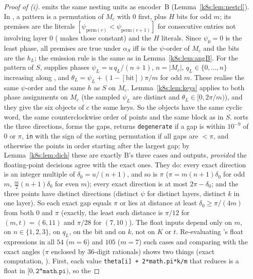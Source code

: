 \begin{proof}[Proof of (i)]
 emits the same nesting units as encoder~B (Lemma~\ref{k8s:lem:nestcl}). In , a pattern is a
permutation  of $M_c$ with $0$ first, plus $H$ bits for odd $m$; its premises are the literals
$[\psi_{\mathrm{perm}(r)}<\psi_{\mathrm{perm}(r+1)}]$ for consecutive entries not involving layer $0$ ( makes
those constant) and the $H$ literals. Since $\psi_0=0$ is the least phase, all premises are true under $\alpha_S$ iff
 is the $\psi$-order of $M_c$ and the bits are the $h_L$; the emission rule is the same as in
Lemma~\ref{k8s:lem:angB}. For the pattern of $S$,  supplies phases $\psi_L=u\,q_L/(n+1)$, $n=|M_c|$,
$q_L\in\{0,\dots,n\}$ increasing along , and $\theta_L=\psi_L+(1-[\text{bit}])\pi/m$ for odd $m$. These realise the
same $\psi$-order and the same $h$ as $S$ on $M_c$. Lemma~\ref{k8s:lem:keys} applies to both phase assignments on $M_c$
(the sampled $\psi_L$ are distinct and $\theta_L\in[0,2\pi/m)$), and they give the six objects of $c$ the same keys. So the
objects have the same cyclic word, the same counterclockwise order of points and the same block as in $S$.  sorts the three directions, forms
the gaps, returns \texttt{degenerate} if a gap is within $10^{-9}$ of $0$ or $\pi$, \texttt{in} with the sign of the
sorting permutation if all gaps are $<\pi$, and otherwise the points in order starting after the largest gap; by
Lemma~\ref{k8s:lem:dich} these are exactly B's three cases and outputs, \emph{provided} the floating-point decisions
agree with the exact ones. They do: every exact direction is an integer multiple of $\delta_0=u/(n+1)$, and so is $\pi$
($\pi=m(n+1)\delta_0$ for odd $m$, $\frac{m}{2}(n+1)\delta_0$ for even $m$); every exact direction is at most $2\pi-\delta_0$;
and the three points have distinct directions (distinct $\psi$ for distinct layers, distinct $k$ in one layer). So each
exact gap equals $\pi$ or lies at distance at least $\delta_0\ge\pi/(4m)$ from both $0$ and $\pi$ (exactly, the least
such distance is $\pi/12$ for $(m,t)=(6,11)$ and $\pi/28$ for $(7,10)$). The float inputs depend only on $m$, on
$n\in\{1,2,3\}$, on $q_L$, on the bit and on $k$, not on $K$ or $t$. Re-evaluating 's float expressions in
all $54$ ($m=6$) and $105$ ($m=7$) such cases and comparing with the exact angles ($\pi$ enclosed by $36$-digit
rationals) shows two things (exact computation, ). First, each value
\texttt{theta[i] + 2*math.pi*k/m} that  reduces is a float in $[0,\texttt{2*math.pi})$, so the

\end{proof}
